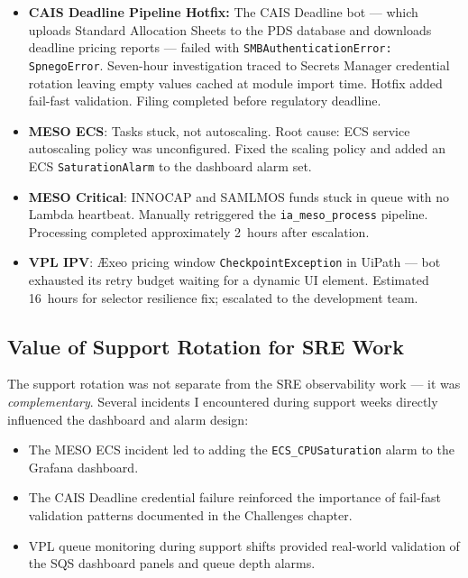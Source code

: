 \begin{itemize}
    \item \textbf{CAIS Deadline Pipeline Hotfix:} The CAIS Deadline bot --- which uploads Standard Allocation Sheets to the PDS database and downloads deadline pricing reports --- failed with
          \texttt{SMBAuthenticationError: SpnegoError}. Seven-hour
          investigation traced to Secrets Manager credential rotation
          leaving empty values cached at module import time. Hotfix
          added fail-fast validation. Filing completed before regulatory
          deadline.

    \item \textbf{MESO ECS}: Tasks stuck, not autoscaling.
          Root cause: ECS service autoscaling policy was unconfigured.
          Fixed the scaling policy and added an ECS \texttt{SaturationAlarm}
          to the dashboard alarm set.

    \item \textbf{MESO Critical}: INNOCAP and SAMLMOS funds
          stuck in queue with no Lambda heartbeat. Manually retriggered
          the \texttt{ia\_meso\_process} pipeline. Processing completed
          approximately 2~hours after escalation.

    \item \textbf{VPL IPV}: \AE xeo pricing window
          \texttt{CheckpointException} in UiPath --- bot exhausted its
          retry budget waiting for a dynamic UI element. Estimated 16~hours
          for selector resilience fix; escalated to the development team.
\end{itemize}

\subsection{Value of Support Rotation for SRE Work}

The support rotation was not separate from the SRE observability work ---
it was \emph{complementary}. Several incidents I encountered during support
weeks directly influenced the dashboard and alarm design:

\begin{itemize}
    \item The MESO ECS incident led to adding the
          \texttt{ECS\_CPUSaturation} alarm to the Grafana dashboard.

    \item The CAIS Deadline credential failure reinforced the importance
          of fail-fast validation patterns documented in the Challenges
          chapter.

    \item VPL queue monitoring during support shifts provided real-world
          validation of the SQS dashboard panels and queue depth alarms.
\end{itemize}

